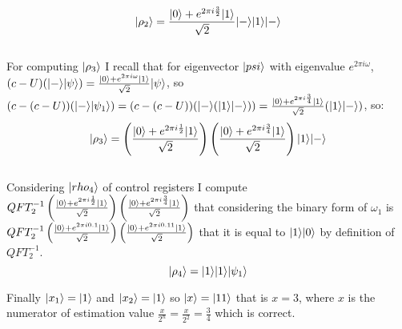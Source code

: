 \documentclass{article}
\DeclarePairedDelimiter\ket{\lvert}{\rangle}
\begin{document}
\[ \ket{\rho_2} = \frac{\ket{0}+e^{2\pi i \frac{3}{2}}\ket{1}}{\sqrt{2}}\ket{-}\ket{1}\ket{-} \]
\\
For computing $\ket{\rho_3}$ I recall that for eigenvector $\ket{psi}$ with eigenvalue $e^{2\pi i \omega}$, $(c-U)(\ket{-}\ket{\psi}) = \frac{\ket{0}+e^{2\pi i \omega}\ket{1}}{\sqrt{2}}\ket{\psi}$, so $(c-(c-U))(\ket{-}\ket{\psi_1}) = (c-(c-U))(\ket{-}(\ket{1}\ket{-})) = \frac{\ket{0}+e^{2\pi i \frac{3}{4}}\ket{1}}{\sqrt{2}}(\ket{1}\ket{-})$, so:
\[ \ket{\rho_3} = \left(\frac{\ket{0}+e^{2\pi i \frac{1}{2}}\ket{1}}{\sqrt{2}}\right)\left(\frac{\ket{0}+e^{2\pi i \frac{3}{4}}\ket{1}}{\sqrt{2}}\right)\ket{1}\ket{-} \]
\\
Considering $\ket{rho_4}$ of control registers I compute $QFT^{-1}_{2}\left(\frac{\ket{0}+e^{2\pi i \frac{1}{2}}\ket{1}}{\sqrt{2}}\right)\left(\frac{\ket{0}+e^{2\pi i \frac{3}{4}}\ket{1}}{\sqrt{2}}\right)$ that considering the binary form of $\omega_1$ is $QFT^{-1}_{2}\left(\frac{\ket{0}+e^{2\pi i 0.1}\ket{1}}{\sqrt{2}}\right)\left(\frac{\ket{0}+e^{2\pi i 0.11}\ket{1}}{\sqrt{2}}\right) $ that it is equal to $\ket{1}\ket{0}$ by definition of $QFT^{-1}_{2}$. \\
\[\ket{\rho_4} = \ket{1}\ket{1}\ket{\psi_1}\]

Finally $\ket{x_1} = \ket{1}$ and $\ket{x_2} = \ket{1}$ so $\ket{x} = \ket{11}$ that is $x = 3$, where $x$ is the numerator of estimation value $\frac{x}{2^n} =\frac{x}{2^2} = \frac{3}{4}$ which is correct.
\end{document}
